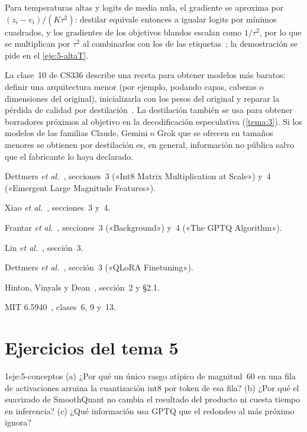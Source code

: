 Para temperaturas altas y logits de media nula, el gradiente se aproxima por $(z_i-v_i)/(K\tau^{2})$: destilar equivale entonces a igualar logits por mínimos cuadrados, y los gradientes de los objetivos blandos escalan como $1/\tau^{2}$, por lo que se multiplican por $\tau^{2}$ al combinarlos con los de las etiquetas~\cite[§2.1]{hinton}; la demostración se pide en el \cref{eje:5-altaT}.

\begin{observacion}
La clase~10 de CS336 describe una receta para obtener modelos más baratos: definir una arquitectura menor (por ejemplo, podando capas, cabezas o dimensiones del original), inicializarla con los pesos del original y reparar la pérdida de calidad por destilación~\cite{cs336}. La destilación también se usa para obtener borradores próximos al objetivo en la decodificación especulativa (\cref{tema:3}). Si los modelos de las familias Claude, Gemini o Grok que se ofrecen en tamaños menores se obtienen por destilación es, en general, información no pública salvo que el fabricante lo haya declarado.
\end{observacion}

\begin{lecturas}
\item Dettmers \emph{et al.}~\cite{llmint8}, secciones~3 («Int8 Matrix Multiplication at Scale») y~4 («Emergent Large Magnitude Features»).
\item Xiao \emph{et al.}~\cite{smoothquant}, secciones~3 y~4.
\item Frantar \emph{et al.}~\cite{gptq}, secciones~3 («Background») y~4 («The GPTQ Algorithm»).
\item Lin \emph{et al.}~\cite{awq}, sección~3.
\item Dettmers \emph{et al.}~\cite{qlora}, sección~3 («QLoRA Finetuning»).
\item Hinton, Vinyals y Dean~\cite{hinton}, sección~2 y §2.1.
\item MIT 6.5940~\cite{mit65940}, clases~6, 9 y~13.
\end{lecturas}

\section*{Ejercicios del tema 5}

\begin{ejercicio}{1}{eje:5-conceptos}
(a) ¿Por qué un único rasgo atípico de magnitud~60 en una fila de activaciones arruina la cuantización int8 por token de esa fila? (b) ¿Por qué el suavizado de SmoothQuant no cambia el resultado del producto ni cuesta tiempo en inferencia? (c) ¿Qué información usa GPTQ que el redondeo al más próximo ignora?
\end{ejercicio}

